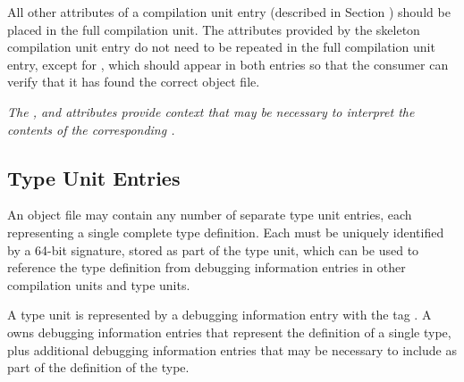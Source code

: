 All other attributes of a compilation unit entry (described
in Section ) 
should be placed in the full compilation unit.
The attributes provided by the skeleton compilation
unit entry do not need to be repeated in the full compilation
unit entry, except for \DWATdwoid, which should appear in
both entries so that the consumer can verify that it has
found the correct object file.

\textit{The \DWATaddrbase{}, \DWATrangesbase{} and \DWATstroffsetsbase{}
attributes provide context that may be necessary to interpret the contents
of the corresponding \splitDWARFobjectfile.}

\subsection{Type Unit Entries}
\label{chap:typeunitentries}
An object file may contain any number of separate type
unit entries, each representing a single complete type
definition. 
Each  must be uniquely identified by
a 64-bit signature, stored as part of the type unit, which
can be used to reference the type definition from debugging
information entries in other compilation units and type units.

A type unit is represented by a debugging information entry
with the tag \DWTAGtypeunitTARG. 
A  owns debugging
information entries that represent the definition of a single
type, plus additional debugging information entries that may
be necessary to include as part of the definition of the type.

